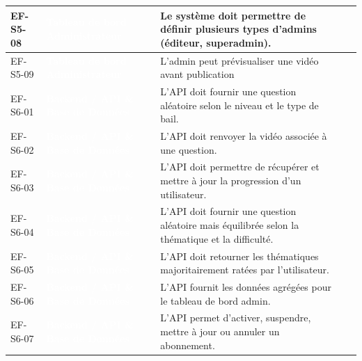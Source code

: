 \begin{longtable}{|P{1.75cm}|P{2.65cm}|P{7.45cm}|P{1.80cm}|P{1.55cm}|}
EF-S5-08 & \textcolor{white}{\textbf{Tableau de bord Administrateur}} & Le système doit permettre de définir plusieurs types d’admins (éditeur, superadmin). &  &  \\ \hline
EF-S5-09 & \textcolor{white}{\textbf{Tableau de bord Administrateur}} & L’admin peut prévisualiser une vidéo avant publication &  &  \\ \hline
EF-S6-01 & \textcolor{white}{\textbf{Backend / API \& Base de Données}} & L’API doit fournir une question aléatoire selon le niveau et le type de bail. &  &  \\ \hline
EF-S6-02 & \textcolor{white}{\textbf{Backend / API \& Base de Données}} & L’API doit renvoyer la vidéo associée à une question. &  &  \\ \hline
EF-S6-03 & \textcolor{white}{\textbf{Backend / API \& Base de Données}} & L’API doit permettre de récupérer et mettre à jour la progression d’un utilisateur. &  &  \\ \hline
EF-S6-04 & \textcolor{white}{\textbf{Backend / API \& Base de Données}} & L’API doit fournir une question aléatoire mais équilibrée selon la thématique et la difficulté. &  &  \\ \hline
EF-S6-05 & \textcolor{white}{\textbf{Backend / API \& Base de Données}} & L’API doit retourner les thématiques majoritairement ratées par l’utilisateur. &  &  \\ \hline
EF-S6-06 & \textcolor{white}{\textbf{Backend / API \& Base de Données}} & L’API fournit les données agrégées pour le tableau de bord admin. &  &  \\ \hline
EF-S6-07 & \textcolor{white}{\textbf{Backend / API \& Base de Données}} & L’API permet d’activer, suspendre, mettre à jour ou annuler un abonnement. &  &  \\ \hline

\end{longtable}
